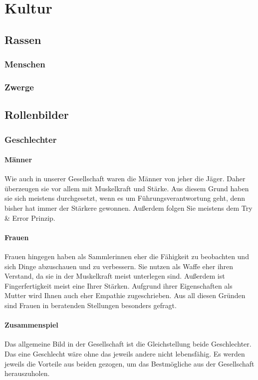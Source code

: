 \chapter{Kultur}
\section{Rassen}
\subsection{Menschen}
\subsection{Zwerge}

\section{Rollenbilder}
\subsection{Geschlechter}
\subsubsection{Männer} 
Wie auch in unserer Gesellschaft waren die Männer von jeher die Jäger. Daher überzeugen sie vor allem mit Muskelkraft und Stärke. 
Aus diesem Grund haben sie sich meistens durchgesetzt, wenn es um Führungsverantwortung geht, denn bisher hat immer der Stärkere gewonnen. 
Außerdem folgen Sie meistens dem Try \& Error Prinzip.
	
\subsubsection{Frauen} 
Frauen hingegen haben als Sammlerinnen eher die Fähigkeit zu beobachten und sich Dinge abzuschauen und zu verbessern. 
Sie nutzen als Waffe eher ihren Verstand, da sie in der Muskelkraft meist unterlegen sind. 
Außerdem ist Fingerfertigkeit meist eine Ihrer Stärken.
Aufgrund ihrer Eigenschaften als Mutter wird Ihnen auch eher Empathie zugeschrieben. 
Aus all diesen Gründen sind Frauen in beratenden Stellungen besonders gefragt.
	
\subsubsection{Zusammenspiel}
Das allgemeine Bild in der Gesellschaft ist die Gleichstellung beide Geschlechter. 
Das eine Geschlecht wäre ohne das jeweils andere nicht lebensfähig. 
Es werden jeweils die Vorteile aus beiden gezogen, um das Bestmögliche aus der Gesellschaft herauszuholen.

